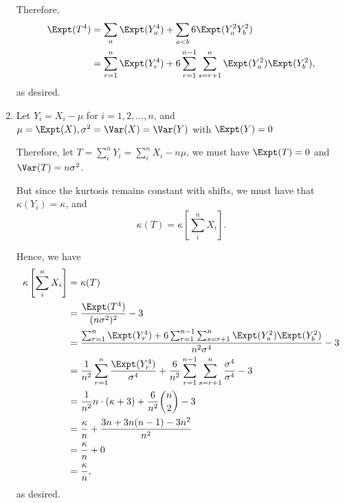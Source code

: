 \begin{enumerate}
          Therefore,
          \begin{align*}
              \Expt(T^4) & = \sum_a \Expt(Y_a^4) + \sum_{a < b} 6 \Expt(Y_a^2 Y_b^2)                                                \\
                         & = \sum_{r = 1}^{n} \Expt(Y_r^4) + 6 \sum_{r = 1}^{n - 1} \sum_{s = r + 1}^{n} \Expt(Y_a^2) \Expt(Y_b^2),
          \end{align*}
          as desired.

    \item Let \(Y_i = X_i - \mu\) for \(i = 1, 2, \ldots, n\), and \(\mu = \Expt(X), \sigma^2 = \Var(X) = \Var(Y)\) with \(\Expt(Y) = 0\)

          Therefore, let \(T = \sum_{i}^{n} Y_i = \sum_{i}^{n} X_i - n\mu\), we must have \(\Expt(T) = 0\) and \(\Var(T) = n \sigma^2\).

          But since the kurtosis remains constant with shifts, we must have that \(\kappa(Y_i) = \kappa\), and
          \[
              \kappa(T) = \kappa\left[\sum_{i}^{n} X_i \right].
          \]

          Hence, we have
          \begin{align*}
              \kappa\left[\sum_{i}^{n} X_i \right] & = \kappa(T)                                                                                                                                            \\
                                                   & = \frac{\Expt(T^4)}{(n \sigma^2)^2} - 3                                                                                                                \\
                                                   & = \frac{\sum_{r = 1}^{n} \Expt(Y_r^4) + 6 \sum_{r = 1}^{n - 1} \sum_{s = r + 1}^{n} \Expt(Y_a^2) \Expt(Y_b^2)}{n^2 \sigma^4} - 3                       \\
                                                   & = \frac{1}{n^2} \sum_{r = 1}^{n} \frac{\Expt(Y_r^4)}{\sigma^4} + \frac{6}{n^2} \sum_{r = 1}^{n - 1} \sum_{s = r + 1}^{n} \frac{\sigma^4}{\sigma^4} - 3 \\
                                                   & = \frac{1}{n^2} n \cdot (\kappa + 3) + \frac{6}{n^2} \binom{n}{2} - 3                                                                                  \\
                                                   & = \frac{\kappa}{n} + \frac{3n + 3n(n - 1) - 3n^2}{n^2}                                                                                                 \\
                                                   & = \frac{\kappa}{n} + 0                                                                                                                                 \\
                                                   & = \frac{\kappa}{n},
          \end{align*}
          as desired.
\end{enumerate}